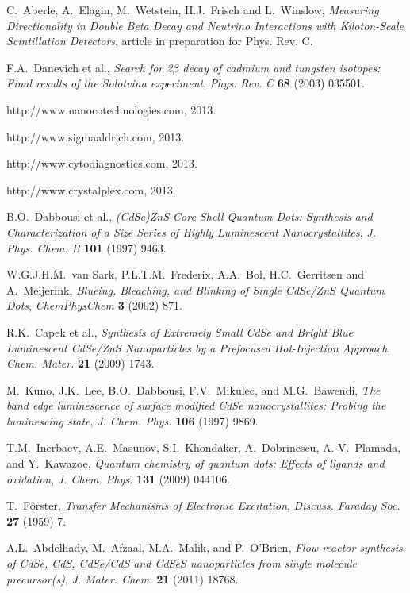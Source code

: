 \documentclass[cits]{JINST}
\begin{document}
\begin{thebibliography}{9}
C.~Aberle, A.~Elagin, M.~Wetstein, H.J.~Frisch and L.~Winslow, \emph{Measuring Directionality in Double Beta Decay and Neutrino Interactions with Kiloton-Scale Scintillation Detectors}, article in preparation for Phys. Rev. C. 
 
F.A.~Danevich et al., \emph{Search for 2$\beta$ decay of cadmium and tungsten isotopes: Final results of the Solotvina experiment}, \emph{Phys. Rev. C} {\bf 68} (2003) 035501.

http://www.nanocotechnologies.com, 2013. 

http://www.sigmaaldrich.com, 2013. 

http://www.cytodiagnostics.com, 2013.

http://www.crystalplex.com, 2013. 

B.O.~Dabbousi et al., \emph{(CdSe)ZnS Core Shell Quantum Dots: Synthesis and Characterization of a Size Series of Highly Luminescent Nanocrystallites}, \emph{J. Phys. Chem. B} {\bf 101} (1997) 9463.

W.G.J.H.M.~van Sark, P.L.T.M.~Frederix, A.A.~Bol, H.C.~Gerritsen and A.~Meijerink, \emph{Blueing, Bleaching, and Blinking of Single CdSe/ZnS Quantum Dots}, \emph{ChemPhysChem} {\bf 3} (2002) 871.

R.K.~Capek et al., \emph{Synthesis of Extremely Small CdSe and Bright Blue Luminescent CdSe/ZnS Nanoparticles by a Prefocused Hot-Injection Approach}, \emph{Chem. Mater.} {\bf 21} (2009) 1743.

M.~Kuno, J.K.~Lee, B.O.~Dabbousi, F.V.~Mikulec, and M.G.~Bawendi, \emph{The band edge luminescence of surface modified CdSe nanocrystallites: Probing the luminescing state}, \emph{J. Chem. Phys.} {\bf 106} (1997) 9869.

T.M.~Inerbaev, A.E.~Masunov, S.I.~Khondaker, A.~Dobrinescu, A.-V.~Plamada, and Y.~Kawazoe, \emph{Quantum chemistry of quantum dots: Effects of ligands and oxidation}, \emph{J. Chem. Phys.} {\bf 131} (2009) 044106. 

T.~F\"{o}rster, \emph{Transfer Mechanisms of Electronic Excitation}, \emph{Discuss. Faraday Soc.} {\bf 27} (1959) 7.

A.L.~Abdelhady, M.~Afzaal, M.A.~Malik, and P.~O'Brien, \emph{Flow reactor synthesis of CdSe, CdS, CdSe/CdS and CdSeS nanoparticles from single molecule precursor(s)}, \emph{J. Mater. Chem.} {\bf 21} (2011) 18768.


\end{thebibliography}
\end{document}
